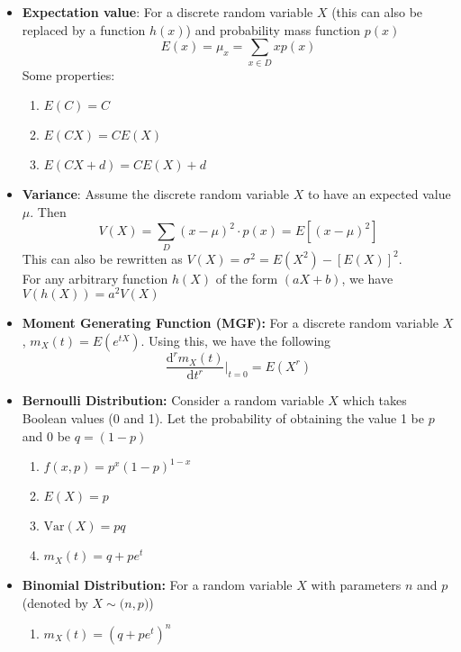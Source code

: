 \documentclass[a4paper]{article}
\begin{document}
\begin{itemize}
    \item \textbf{Expectation value}: For a discrete random variable $X$ (this can also be replaced by a function $h(x)$) and probability mass function $p(x)$
    \begin{equation*}
        E(x) = \mu_x = \sum_{x\in D}xp(x)
    \end{equation*}
    Some properties:
    \begin{enumerate}
        \item $E(C) = C$
        \item $E(CX) = CE(X)$
        \item $E(CX+d) = CE(X) + d$
    \end{enumerate}
    \item \textbf{Variance}: Assume the discrete random variable $X$ to have an expected value $\mu$. Then
    \begin{equation*}
        V(X) = \sum_{D}^{}(x-\mu)^2\cdot p(x) = E[(x-\mu)^2]
    \end{equation*}
    This can also be rewritten as $V(X) = \sigma^2 = E(X^2)- [E(X)]^2$.\\
    For any arbitrary function $h(X)$ of the form $(aX+b)$, we have $V(h(X)) = a^2V(X)$
    \item \textbf{Moment Generating Function (MGF): }For a discrete random variable $X$, $m_X(t) = E(e^{tX})$. Using this, we have the following
    \begin{equation*}
        \frac{\mathrm{d}^rm_X(t)}{\mathrm{d}t^r}\biggr\rvert_{t = 0} = E(X^r)
    \end{equation*}
    \item \textbf{Bernoulli Distribution: } Consider a random variable $X$ which takes Boolean values (0 and 1). Let the probability of obtaining the value 1 be $p$ and $0$ be $q = (1-p)$ 
    \begin{enumerate}
        \item $f(x, p) = p^x(1-p)^{1-x}$
        \item $E(X) = p$
        \item $\text{Var}(X) = pq$
        \item $m_X(t) = q+pe^t$
    \end{enumerate}
    \item \textbf{Binomial Distribution: } For a random variable $X$ with parameters $n$ and $p$ (denoted by $X\sim\mathcal(n,p)$)
    \begin{enumerate}
        \item $m_X(t) = (q+pe^t)^n$

\end{enumerate}
\end{itemize}
\end{document}
